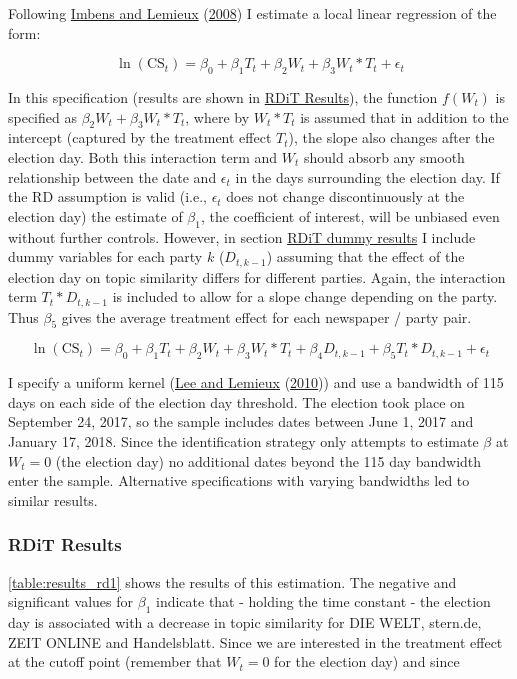 \documentclass[
]{article}
\begin{document}
Following \protect\hyperlink{ref-imbens_regression_2008}{Imbens and
Lemieux} (\protect\hyperlink{ref-imbens_regression_2008}{2008}) I
estimate a local linear regression of the form:

\[
\ln(\text{CS}_{t})=\beta_0+\beta_1T_t+\beta_2W_t+\beta_3W_t*T_t+\epsilon_t
\]

In this specification (results are shown in
\protect\hyperlink{RDiT-Results}{RDiT Results}), the function \(f(W_t)\)
is specified as \(\beta_2W_t+\beta_3W_t*T_t\), where by \(W_t*T_t\) is
assumed that in addition to the intercept (captured by the treatment
effect \(T_t\)), the slope also changes after the election day. Both
this interaction term and \(W_t\) should absorb any smooth relationship
between the date and \(\epsilon_t\) in the days surrounding the election
day. If the RD assumption is valid (i.e., \(\epsilon_t\) does not change
discontinuously at the election day) the estimate of \(\beta_1\), the
coefficient of interest, will be unbiased even without further controls.
However, in section \protect\hyperlink{RDiT-dummy-results}{RDiT dummy
results} I include dummy variables for each party \(k\) (\(D_{t,k-1}\))
assuming that the effect of the election day on topic similarity differs
for different parties. Again, the interaction term \(T_t*D_{t,k-1}\) is
included to allow for a slope change depending on the party. Thus
\(\beta_5\) gives the average treatment effect for each newspaper /
party pair.

\[
\ln(\text{CS}_{t})=\beta_0+\beta_1T_t+\beta_2W_{t}+\beta_3W_t*T_t+\beta_4D_{t,k-1}+\beta_5T_t*D_{t,k-1}+\epsilon_t
\]

I specify a uniform kernel
(\protect\hyperlink{ref-lee_regression_2010}{Lee and Lemieux}
(\protect\hyperlink{ref-lee_regression_2010}{2010})) and use a bandwidth
of 115 days on each side of the election day threshold. The election
took place on September 24, 2017, so the sample includes dates between
June 1, 2017 and January 17, 2018. Since the identification strategy
only attempts to estimate \(\beta\) at \(W_t=0\) (the election day) no
additional dates beyond the 115 day bandwidth enter the sample.
Alternative specifications with varying bandwidths led to similar
results.

\hypertarget{rdit-results}{%
\subsubsection{RDiT Results}\label{rdit-results}}

\autoref{table:results_rd1} shows the results of this estimation. The
negative and significant values for \(\beta_1\) indicate that - holding
the time constant - the election day is associated with a decrease in
topic similarity for DIE WELT, stern.de, ZEIT ONLINE and Handelsblatt.
Since we are interested in the treatment effect at the cutoff point
(remember that \(W_t=0\) for the election day) and since
\end{document}
